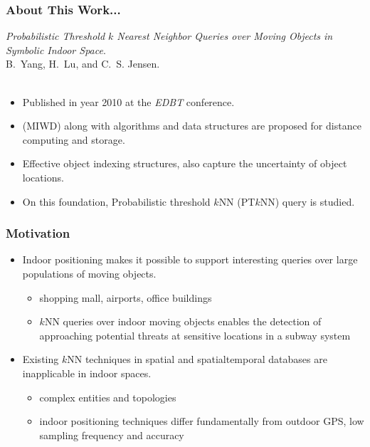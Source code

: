 \begin{frame}
\frametitle{About This Work...}

\emph{Probabilistic Threshold $k$ Nearest Neighbor Queries over Moving Objects in Symbolic Indoor Space}.~\cite{DBLP:conf/edbt/YangLJ10} \\
B.~Yang, H.~Lu, and C.~S. Jensen.\\~\\

\begin{itemize}
  \item Published in year 2010 at the \emph{EDBT} conference.
  \item {}(MIWD) along with algorithms and data structures are proposed for distance computing and storage.
  \item Effective object indexing structures, also capture the uncertainty of object locations.
  \item On this foundation, Probabilistic threshold $k$NN (PT$k$NN) query is studied.
\end{itemize}

\end{frame}

\begin{frame}
\frametitle{Motivation}

\begin{itemize}
  \item Indoor positioning makes it possible to support interesting queries over large populations of moving objects.\cite{jensen2010indoor}
    \begin{itemize}
      \item shopping mall, airports, office buildings
      \item $k$NN queries over indoor moving objects enables the detection of approaching potential threats at sensitive locations in a subway system
    \end{itemize}

  \item Existing $k$NN techniques in spatial and spatialtemporal databases are inapplicable in indoor spaces.
    \begin{itemize}
      \item complex entities and topologies
      \item indoor positioning techniques differ fundamentally from outdoor GPS, low sampling frequency and accuracy
    \end{itemize}
\end{itemize}

\end{frame}

